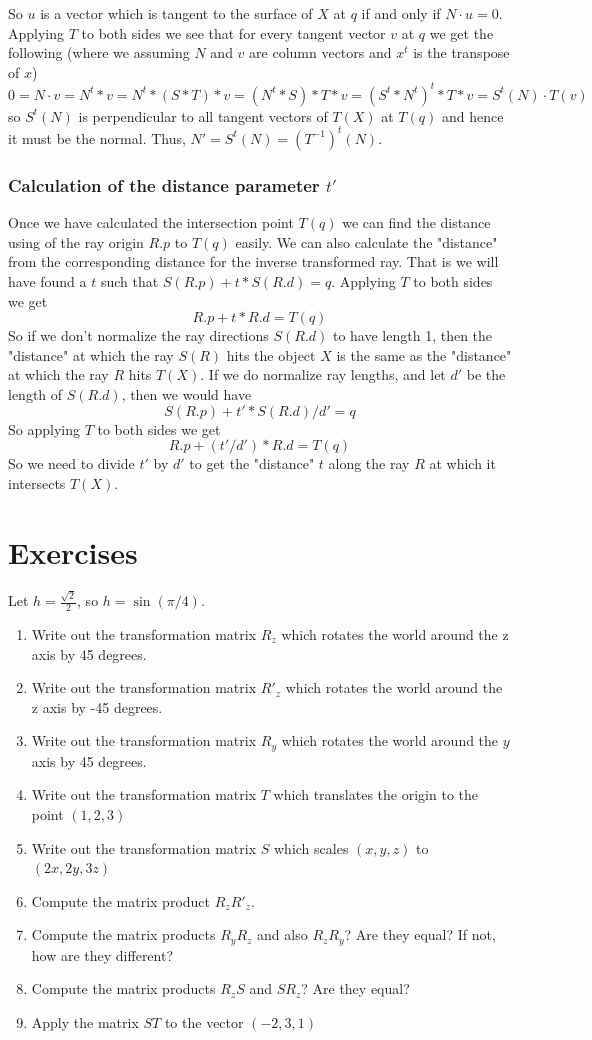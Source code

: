 \documentclass{book}
\begin{document}
So $u$ is a vector which is tangent to the surface of $X$ at $q$ if and only if $ N \cdot u = 0$.  Applying $T$ to both sides we see that for every tangent vector $v$ at $q$ we get the following (where we assuming $N$ and $v$ are column vectors and $x^t$ is the transpose of $x$)
\[
0 =  N \cdot v = N^t * v = N^t * (S*T)*v = (N^t*S) * T*v = (S^t*N^t)^t * T*v = S^t(N) \cdot T(v)
\]
so $S^t(N)$ is perpendicular to all tangent vectors of $T(X)$ at $T(q)$ and hence it must be the normal.
Thus, $N' = S^t(N) = (T^{-1})^t(N)$.

\subsubsection{Calculation of the distance parameter $t'$}
Once we have calculated the intersection point $T(q)$ we can find the distance using of the ray origin $R.p$ to $T(q)$ easily. We can also calculate the "distance" from the corresponding distance for the inverse transformed ray.
That is we will have found a $t$ such that $S(R.p) + t*S(R.d) = q$.  Applying $T$ to both sides we get
\[
R.p + t*R.d = T(q)
\]
So if we don't normalize the ray directions $S(R.d)$ to have length 1, then the "distance" at which the ray $S(R)$ hits the object $X$ is the same as the "distance" at which the ray $R$ hits $T(X)$.  If we do normalize ray lengths, and let $d'$ be the length of $S(R.d)$, then we would have
\[
S(R.p) + t'*S(R.d)/d' = q
\]
So applying $T$ to both sides we get
\[
R.p + (t'/d')*R.d = T(q)
\]
So we need to divide $t'$ by $d'$ to get the "distance" $t$ along the ray $R$ at which it intersects $T(X)$.



\section{Exercises}
Let $h = \frac{\sqrt{2}}{2}$, so $h = \sin(\pi/4)$.
\begin{enumerate}
\item Write out the transformation matrix $R_z$ which rotates the world around the z axis by 45 degrees.
\item Write out the transformation matrix $R'_z$ which rotates the world around the z axis by -45 degrees.
\item Write out the transformation matrix $R_y$ which rotates the world around the $y$ axis by 45 degrees.
\item Write out the transformation matrix $T$ which translates the origin to the point $(1, 2, 3)$
\item Write out the transformation matrix $S$ which scales $(x,y,z)$ to $(2x, 2y, 3z)$
\item Compute the matrix product $R_z R'_z$.
\item Compute the matrix products $R_y R_z$ and also $R_z R_y$? Are they equal? If not, how are they different?
\item Compute the matrix products $R_z S$ and $S R_z$? Are they equal?
\item Apply the matrix $S T$ to the vector $(-2,3,1)$
\end{enumerate}
\end{document}
